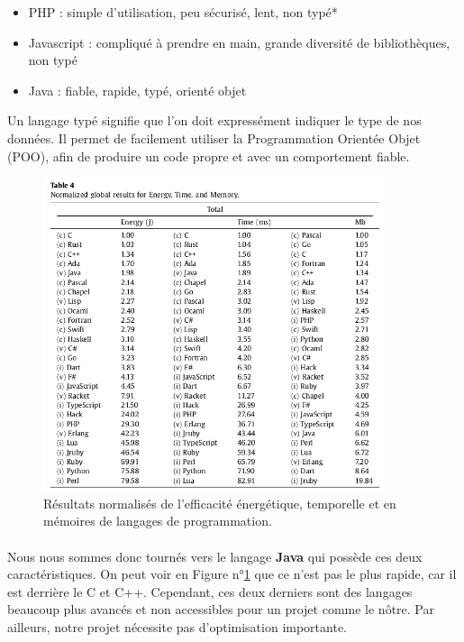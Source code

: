 \documentclass[a4paper, 12pt]{article}
\begin{document}
\begin{itemize}
	\item PHP : simple d’utilisation, peu sécurisé, lent, non typé*
	\item Javascript : compliqué à prendre en main, grande diversité de bibliothèques, non typé
	\item Java : fiable, rapide, typé, orienté objet
\end{itemize}

\noindent *Un langage typé signifie que l’on doit expressément indiquer le type de nos données. Il permet de facilement utiliser la Programmation Orientée Objet (POO), afin de produire un code propre et avec un comportement fiable. 

\begin{figure}[H]
	\begin{center}
		\includegraphics[width=10cm]{fig/tableLang}
		\caption{Résultats normalisés de l'efficacité énergétique, temporelle et en mémoires de langages de programmation.\cite{pereira_ranking_2021}}
		\label{fig:tableLang}
	\end{center}
\end{figure}

\paragraph{}Nous nous sommes donc tournés vers le langage \textbf{Java} qui possède ces deux caractéristiques. On peut voir en Figure n°\ref{fig:tableLang} que ce n’est pas le plus rapide, car il est derrière le C et C++. Cependant, ces deux derniers sont des langages beaucoup plus avancés et non accessibles pour un  projet comme le nôtre. Par ailleurs, notre projet nécessite pas d'optimisation importante.
\end{document}
